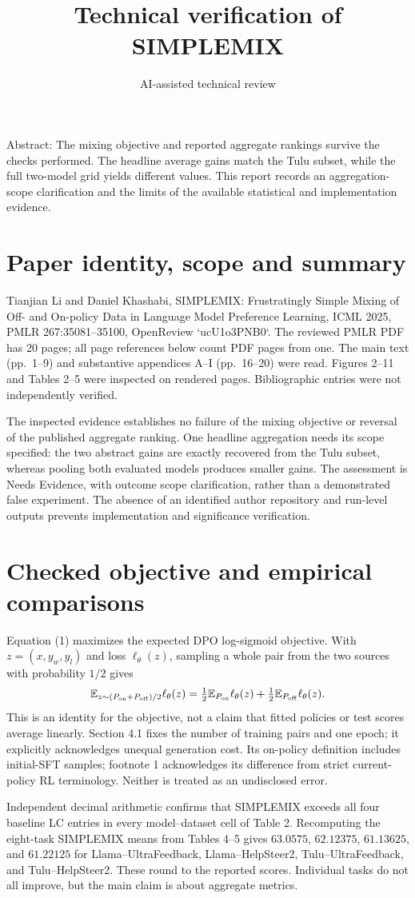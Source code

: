 \documentclass[10pt]{article}
\title{Technical verification of SIMPLEMIX}
\author{AI-assisted technical review}
\date{}
\begin{document}
\maketitle
Abstract: The mixing objective and reported aggregate rankings survive the checks performed. The headline average gains match the Tulu subset, while the full two-model grid yields different values. This report records an aggregation-scope clarification and the limits of the available statistical and implementation evidence.\par
\section*{Paper identity, scope and summary}
Tianjian Li and Daniel Khashabi, SIMPLEMIX: Frustratingly Simple Mixing of Off- and On-policy Data in Language Model Preference Learning, ICML 2025, PMLR 267:35081–35100, OpenReview `ucU1o3PNB0`. The reviewed PMLR PDF has 20 pages; all page references below count PDF pages from one. The main text (pp. 1–9) and substantive appendices A–I (pp. 16–20) were read. Figures 2–11 and Tables 2–5 were inspected on rendered pages. Bibliographic entries were not independently verified.\par
The inspected evidence establishes no failure of the mixing objective or reversal of the published aggregate ranking. One headline aggregation needs its scope specified: the two abstract gains are exactly recovered from the Tulu subset, whereas pooling both evaluated models produces smaller gains. The assessment is Needs Evidence, with outcome scope clarification, rather than a demonstrated false experiment. The absence of an identified author repository and run-level outputs prevents implementation and significance verification.\par
\section*{Checked objective and empirical comparisons}
Equation (1) maximizes the expected DPO log-sigmoid objective. With \(z=(x,y_w,y_l)\) and loss \(\ell_\theta(z)\), sampling a whole pair from the two sources with probability \(1/2\) gives \[\mathbb E_{z\sim (P_{\rm on}+P_{\rm off})/2}\ell_\theta(z)
 =\tfrac12\mathbb E_{P_{\rm on}}\ell_\theta(z)+\tfrac12\mathbb E_{P_{\rm off}}\ell_\theta(z).\] This is an identity for the objective, not a claim that fitted policies or test scores average linearly. Section 4.1 fixes the number of training pairs and one epoch; it explicitly acknowledges unequal generation cost. Its on-policy definition includes initial-SFT samples; footnote 1 acknowledges its difference from strict current-policy RL terminology. Neither is treated as an undisclosed error.\par
Independent decimal arithmetic confirms that SIMPLEMIX exceeds all four baseline LC entries in every model–dataset cell of Table 2. Recomputing the eight-task SIMPLEMIX means from Tables 4–5 gives \(63.0575\), \(62.12375\), \(61.13625\), and \(61.22125\) for Llama–UltraFeedback, Llama–HelpSteer2, Tulu–UltraFeedback, and Tulu–HelpSteer2. These round to the reported scores. Individual tasks do not all improve, but the main claim is about aggregate metrics.\par
\end{document}
